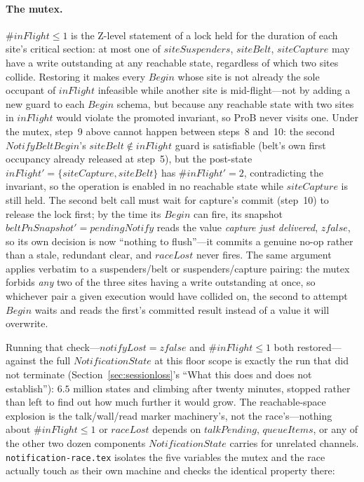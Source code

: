 \documentclass[a4paper,10pt,fleqn]{article}
\begin{document}
\paragraph{The mutex.}  $\# inFlight \leq 1$ is the Z-level statement of
a lock held for the duration of each site's critical section: at most
one of $siteSuspenders$, $siteBelt$, $siteCapture$ may have a write
outstanding at any reachable state, regardless of which two sites
collide.  Restoring it makes every $Begin$ whose site is not already
the sole occupant of $inFlight$ infeasible while another site is
mid-flight---not by adding a new guard to each $Begin$ schema, but
because any reachable state with two sites in $inFlight$ would violate
the promoted invariant, so ProB never visits one.  Under the mutex,
step~9 above cannot happen between steps~8 and~10: the second
$NotifyBeltBegin$'s $siteBelt \notin inFlight$ guard is satisfiable
(belt's own first occupancy already released at step~5), but the
post-state $inFlight' = \{siteCapture, siteBelt\}$ has
$\# inFlight' = 2$, contradicting the invariant, so the operation is
enabled in no reachable state while $siteCapture$ is still held.  The
second belt call must wait for capture's commit (step~10) to release
the lock first; by the time its $Begin$ can fire, its snapshot
$beltPnSnapshot' = pendingNotify$ reads the value \emph{capture just
delivered}, $zfalse$, so its own decision is now ``nothing to
flush''---it commits a genuine no-op rather than a stale, redundant
clear, and $raceLost$ never fires.  The same argument applies verbatim
to a suspenders/belt or suspenders/capture pairing: the mutex forbids
\emph{any} two of the three sites having a write outstanding at once,
so whichever pair a given execution would have collided on, the second
to attempt $Begin$ waits and reads the first's committed result
instead of a value it will overwrite.

Running that check---$notifyLost = zfalse$ and $\# inFlight \leq 1$
both restored---against the full $NotificationState$ at this floor
scope is exactly the run that did not terminate
(Section~\ref{sec:sessionloss}'s ``What this does and does not
establish''): $6.5$ million states and climbing after twenty minutes,
stopped rather than left to find out how much further it would grow.
The reachable-space explosion is the talk/wall/read marker machinery's,
not the race's---nothing about $\# inFlight \leq 1$ or $raceLost$
depends on $talkPending$, $queueItems$, or any of the other two dozen
components $NotificationState$ carries for unrelated channels.
\texttt{notification-race.tex} isolates the five variables the mutex
and the race actually touch as their own machine and checks the
identical property there:
\end{document}
